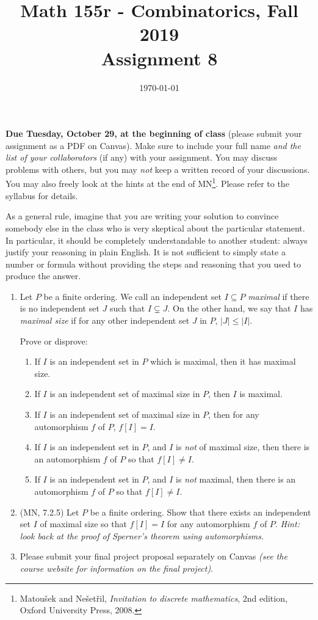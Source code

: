 \documentclass{amsart}
\title[Math 155r, Fall 2019: assignment 8]{Math 155r - Combinatorics, Fall 2019 \\ Assignment 8}
\date{\today}
\theoremstyle{definition}
\begin{document}

\vspace*{-10em}
\maketitle

\textbf{Due Tuesday, October 29, at the beginning of class} (please submit your assignment as a PDF on Canvas). Make sure to include your full name \emph{and the list of your collaborators} (if any) with your assignment. You may discuss problems with others, but you may \emph{not} keep a written record of your discussions. You may also freely look at the hints at the end of MN\footnote{Matoušek and Nešetřil, \emph{Invitation to discrete mathematics}, 2nd edition, Oxford University Press, 2008.}. Please refer to the syllabus for details.

As a general rule, imagine that you are writing your solution to convince somebody else in the class who is very skeptical about the particular statement. In particular, it should be completely understandable to another student: always justify your reasoning in plain English. It is not sufficient to simply state a number or formula without providing the steps and reasoning that you used to produce the answer.

\begin{enumerate}

\item Let $P$ be a finite ordering. We call an independent set $I \subseteq P$ \emph{maximal} if there is no independent set $J$ such that $I \subsetneq J$. On the other hand, we say that $I$ has \emph{maximal size} if for any other independent set $J$ in $P$, $|J| \le |I|$.

  Prove or disprove:

  \begin{enumerate}
  \item If $I$ is an independent set in $P$ which is maximal, then it has maximal size.
  \item If $I$ is an independent set of maximal size in $P$, then $I$ is maximal.
  \item If $I$ is an independent set of maximal size in $P$, then for any automorphism $f$ of $P$, $f[I] = I$.
  \item If $I$ is an independent set in $P$, and $I$ is \emph{not} of maximal size, then there is an automorphism $f$ of $P$ so that $f[I] \neq I$.
  \item If $I$ is an independent set in $P$, and $I$ is \emph{not} maximal, then there is an automorphism $f$ of $P$ so that $f[I] \neq I$.    
  \end{enumerate}
\item (MN, 7.2.5) Let $P$ be a finite ordering. Show that there exists an independent set $I$ of maximal size so that $f[I] = I$ for any automorphism $f$ of $P$. \emph{Hint: look back at the proof of Sperner's theorem using automorphisms.}
\item Please submit your final project proposal separately on Canvas \emph{(see the course website for information on the final project)}.
\end{enumerate}
\end{document}
